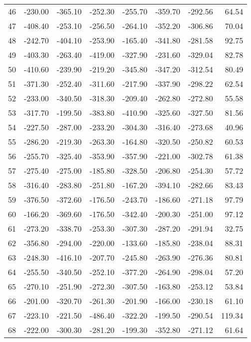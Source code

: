 \begin{longtable}{rrrrrrrr}
46 & -230.00 & -365.10 & -252.30 & -255.70 & -359.70 & -292.56 & 64.54  \\
47 & -408.40 & -253.10 & -256.50 & -264.10 & -352.20 & -306.86 & 70.04  \\
48 & -242.70 & -404.10 & -253.90 & -165.40 & -341.80 & -281.58 & 92.75  \\
49 & -403.30 & -263.40 & -419.00 & -327.90 & -231.60 & -329.04 & 82.78  \\
50 & -410.60 & -239.90 & -219.20 & -345.80 & -347.20 & -312.54 & 80.49  \\
51 & -371.30 & -252.40 & -311.60 & -217.90 & -337.90 & -298.22 & 62.54  \\
52 & -233.00 & -340.50 & -318.30 & -209.40 & -262.80 & -272.80 & 55.58  \\
53 & -317.70 & -199.50 & -383.80 & -410.90 & -325.60 & -327.50 & 81.56  \\
54 & -227.50 & -287.00 & -233.20 & -304.30 & -316.40 & -273.68 & 40.96  \\
55 & -286.20 & -219.30 & -263.30 & -164.80 & -320.50 & -250.82 & 60.53  \\
56 & -255.70 & -325.40 & -353.90 & -357.90 & -221.00 & -302.78 & 61.38  \\
57 & -275.40 & -275.00 & -185.80 & -328.50 & -206.80 & -254.30 & 57.72  \\
58 & -316.40 & -283.80 & -251.80 & -167.20 & -394.10 & -282.66 & 83.43  \\
59 & -376.50 & -372.60 & -176.50 & -243.70 & -186.60 & -271.18 & 97.79  \\
60 & -166.20 & -369.60 & -176.50 & -342.40 & -200.30 & -251.00 & 97.12  \\
61 & -273.20 & -338.70 & -253.30 & -307.30 & -287.20 & -291.94 & 32.75  \\
62 & -356.80 & -294.00 & -220.00 & -133.60 & -185.80 & -238.04 & 88.31  \\
63 & -248.30 & -416.10 & -207.70 & -245.80 & -263.90 & -276.36 & 80.81  \\
64 & -255.50 & -340.50 & -252.10 & -377.20 & -264.90 & -298.04 & 57.20  \\
65 & -270.10 & -251.90 & -272.30 & -307.50 & -163.80 & -253.12 & 53.84  \\
66 & -201.00 & -320.70 & -261.30 & -201.90 & -166.00 & -230.18 & 61.10  \\
67 & -223.10 & -221.50 & -486.40 & -322.20 & -199.50 & -290.54 & 119.34  \\
68 & -222.00 & -300.30 & -281.20 & -199.30 & -352.80 & -271.12 & 61.64  \\

\end{longtable}
